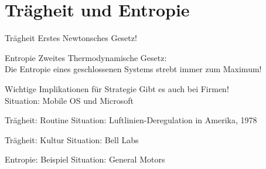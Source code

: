 \section{Trägheit und Entropie}


\begin{frame}[c]{Trägheit}
    \Large
    Erstes Newtonsches Gesetz!
\end{frame}


\begin{frame}[c]{Entropie}
    \Large
    Zweites Thermodynamische Gesetz: \\
    Die Entropie eines geschlossenen Systems strebt immer zum Maximum!
\end{frame}


\begin{frame}[c]{Wichtige Implikationen für Strategie}
    \Large
    Gibt es auch bei Firmen! \\ \pause
    Situation: Mobile OS und Microsoft

\end{frame}


\begin{frame}[c]{Trägheit: Routine}
    \Large
    Situation: Luftlinien-Deregulation in Amerika, 1978
\end{frame}


\begin{frame}[c]{Trägheit: Kultur}
    \Large
    Situation: Bell Labs
\end{frame}


\begin{frame}[c]{Entropie: Beispiel}
    \Large
    Situation: General Motors
\end{frame}


